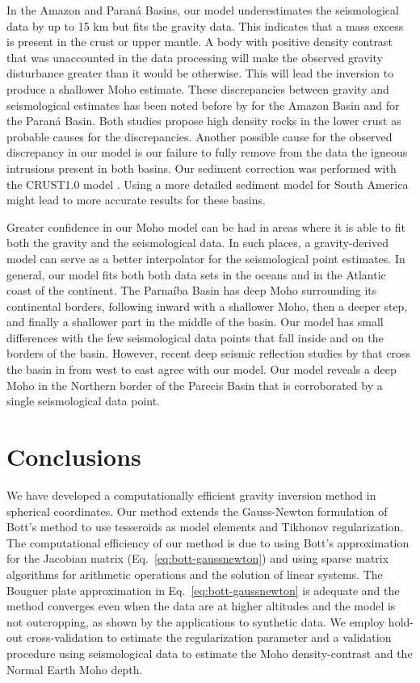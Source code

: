 \documentclass[extra,mreferee]{gji}
\begin{document}
In the Amazon and Paraná Basins, our model underestimates the seismological
data by up to 15 km but fits the gravity data.
This indicates that a mass excess is present in the crust or upper mantle.
A body with positive density contrast that was unaccounted in the data
processing will make the observed gravity disturbance greater than it would
be otherwise.
This will lead the inversion to produce a shallower Moho estimate.
These discrepancies between gravity and seismological estimates has been noted
before by \citet{nunn1988} for the Amazon Basin and \citet{mariani2013}
for the Paraná Basin.
Both studies propose high density rocks in the lower crust as probable causes
for the discrepancies.
Another possible cause for the observed discrepancy in our model is our failure
to fully remove from the data the igneous intrusions present in both basins.
Our sediment correction was performed with the CRUST1.0 model
\citep{laske2013}.
Using a more detailed sediment model for South America might lead to more
accurate results for these basins.

Greater confidence in our Moho model can be had in areas where it is able to
fit both the gravity and the seismological data.
In such places, a gravity-derived model can serve as a better interpolator for
the seismological point estimates.
In general, our model fits both both data sets in the oceans and in the
Atlantic coast of the continent.
The Parnaíba Basin has deep Moho surrounding its continental borders, following
inward with a shallower Moho, then a deeper step, and finally a shallower
part in the middle of the basin.
Our model has small differences with the few seismological data points that
fall inside and on the borders of the basin.
However, recent deep seismic reflection studies by \citet{daly2014} that cross
the basin in from west to east agree with our model.
Our model reveals a deep Moho in the Northern border of the Parecis Basin that
is corroborated by a single seismological data point.

\section{Conclusions}

We have developed a computationally efficient gravity inversion method in
spherical coordinates.
Our method extends the Gauss-Newton formulation of Bott's method
\citep{silva2014} to use tesseroids as model elements and Tikhonov
regularization.
The computational efficiency of our method is due to
using Bott's approximation for the Jacobian matrix
(Eq.~\ref{eq:bott-gaussnewton})
and using sparse matrix algorithms for arithmetic operations and the solution
of linear systems.
The Bouguer plate approximation in Eq.~\ref{eq:bott-gaussnewton} is adequate
and the method converges
even when the data are at higher altitudes and the model is not outcropping,
as shown by the applications to synthetic data.
We employ hold-out cross-validation to estimate the regularization parameter
and a validation procedure using seismological data to estimate the Moho
density-contrast and the Normal Earth Moho depth.
\end{document}
